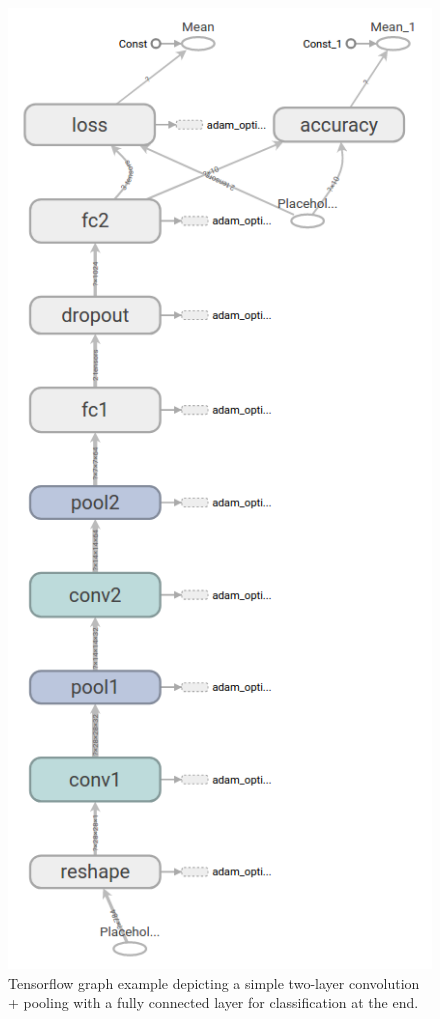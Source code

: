 \begin{figure}[h]
	\includegraphics[scale=0.3]{archivos/tensorflow.png}
	\centering
	\caption{Tensorflow graph example depicting a simple two-layer convolution + pooling with a fully connected layer for classification at the end.}
	\label{fig:tensorflow}
\end{figure}

